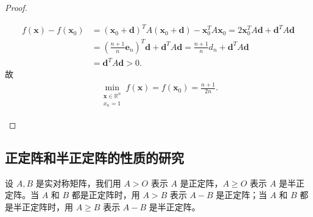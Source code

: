 \documentclass[../../main.tex]{subfiles}%
\begin{document}
\begin{proof}
\begin{enumerate}[(1)]
\begin{align*}
f(\bm{x}) - f(\bm{x}_0) &= (\bm{x}_0 + \bm{d})^T A (\bm{x}_0 + \bm{d}) - \bm{x}_0^T A \bm{x}_0 
= 2\bm{x}_0^T A \bm{d} + \bm{d}^T A \bm{d} \\
&= \left( \frac{n+1}{n}\bm{e}_n \right)^T \bm{d} + \bm{d}^T A \bm{d} = \frac{n+1}{n} d_n + \bm{d}^T A \bm{d} \\
&= \bm{d}^T A \bm{d} > 0.
\end{align*}
故
\begin{align*}
\min\limits_{\substack{\bm{x} \in \mathbb{R}^n \\ x_n=1}} f(\bm{x}) = f(\bm{x}_0) = \frac{n+1}{2n}.
\end{align*}
\end{enumerate}
\end{proof}


\subsection{正定阵和半正定阵的性质的研究}

\begin{definition}[正定阵和半正定阵的记号]
设 \(A,B\) 是实对称矩阵，我们用 \(A > O\) 表示 \(A\) 是正定阵，\(A \geqslant  O\) 表示 \(A\) 是半正定阵。当 \(A\) 和 \(B\) 都是正定阵时，用 \(A > B\) 表示 \(A - B\) 是正定阵；当 \(A\) 和 \(B\) 都是半正定阵时，用 \(A \geqslant  B\) 表示 \(A - B\) 是半正定阵。 
\end{definition}
\end{document}
